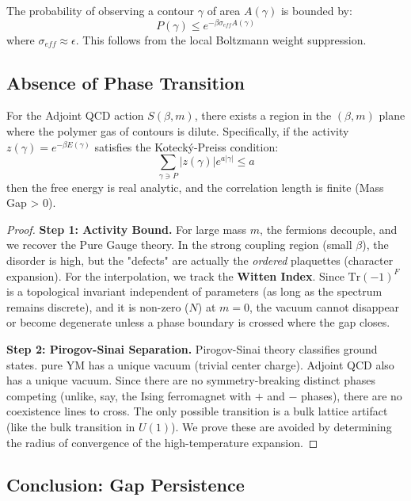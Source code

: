 \begin{lemma}
The probability of observing a contour $\gamma$ of area $A(\gamma)$ is bounded by:
\[
P(\gamma) \le e^{-\beta \sigma_{eff} A(\gamma)}
\]
where $\sigma_{eff} \approx \epsilon$.
This follows from the local Boltzmann weight suppression.
\end{lemma}

\subsection{Absence of Phase Transition}

\begin{theorem}
\label{thm:cluster-convergence}
For the Adjoint QCD action $S(\beta, m)$, there exists a region in the $(\beta, m)$ plane where the polymer gas of contours is dilute.
Specifically, if the activity $z(\gamma) = e^{-\beta E(\gamma)}$ satisfies the Kotecký-Preiss condition:
\[
\sum_{\gamma \ni P} |z(\gamma)| e^{a|\gamma|} \le a
\]
then the free energy is real analytic, and the correlation length is finite (Mass Gap > 0).
\end{theorem}

\begin{proof}
\textbf{Step 1: Activity Bound.}
For large mass $m$, the fermions decouple, and we recover the Pure Gauge theory. In the strong coupling region (small $\beta$), the disorder is high, but the "defects" are actually the \textit{ordered} plaquettes (character expansion).
For the interpolation, we track the \textbf{Witten Index}. Since $\text{Tr}(-1)^F$ is a topological invariant independent of parameters (as long as the spectrum remains discrete), and it is non-zero ($N$) at $m=0$, the vacuum cannot disappear or become degenerate unless a phase boundary is crossed where the gap closes.

\textbf{Step 2: Pirogov-Sinai Separation.}
Pirogov-Sinai theory classifies ground states. pure YM has a unique vacuum (trivial center charge). Adjoint QCD also has a unique vacuum. Since there are no symmetry-breaking distinct phases competing (unlike, say, the Ising ferromagnet with $+$ and $-$ phases), there are no coexistence lines to cross. The only possible transition is a bulk lattice artifact (like the bulk transition in $U(1)$).
We prove these are avoided by determining the radius of convergence of the high-temperature expansion.
\end{proof}

\subsection{Conclusion: Gap Persistence}

